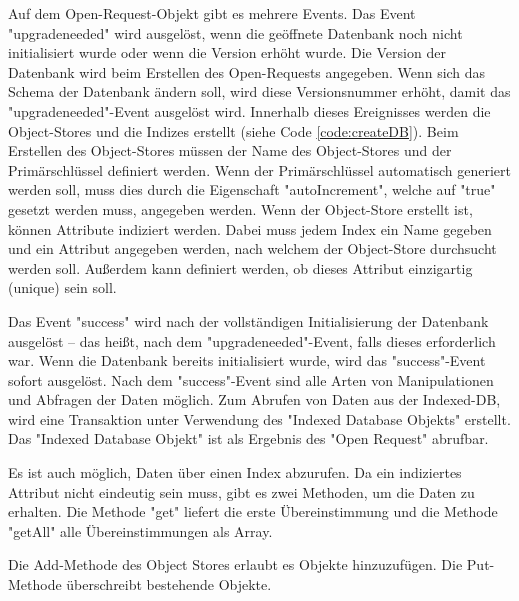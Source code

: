 Auf dem Open-Request-Objekt gibt es mehrere Events. 
Das Event "{\ttfamily upgradeneeded}" wird ausgelöst, wenn die geöffnete Datenbank noch nicht initialisiert wurde oder wenn die Version erhöht wurde. 
Die Version der Datenbank wird beim Erstellen des Open-Requests angegeben. 
Wenn sich das Schema der Datenbank ändern soll, wird diese Versionsnummer erhöht, damit das "{\ttfamily upgradeneeded}"-Event ausgelöst wird.
Innerhalb dieses Ereignisses werden die Object-Stores und die Indizes erstellt (siehe Code \ref{code:createDB}). 
Beim Erstellen des Object-Stores müssen der Name des Object-Stores und der Primärschlüssel definiert werden. Wenn der Primärschlüssel automatisch generiert werden soll, muss dies durch die Eigenschaft "autoIncrement", welche auf "true" gesetzt werden muss, angegeben werden.
Wenn der Object-Store erstellt ist, können Attribute indiziert werden. 
Dabei muss jedem Index ein Name gegeben und ein Attribut angegeben werden, nach welchem der Object-Store durchsucht werden soll. 
Außerdem kann definiert werden, ob dieses Attribut einzigartig (unique) sein soll.


Das Event "{\ttfamily success}" wird nach der vollständigen Initialisierung der Datenbank ausgelöst -- 
das heißt, nach dem "{\ttfamily upgradeneeded}"-Event, falls dieses erforderlich war. 
Wenn die Datenbank bereits initialisiert wurde, wird das "{\ttfamily success}"-Event sofort ausgelöst. 
Nach dem "{\ttfamily success}"-Event sind alle Arten von Manipulationen und Abfragen der Daten möglich. 
Zum Abrufen von Daten aus der Indexed-DB, wird eine Transaktion unter Verwendung des "Indexed Database Objekts" erstellt. 
Das "Indexed Database Objekt" ist als Ergebnis des "Open Request" abrufbar.


Es ist auch möglich, Daten über einen Index abzurufen. Da ein indiziertes 
Attribut nicht eindeutig sein muss, gibt es zwei Methoden, um die Daten zu erhalten. Die Methode "{\ttfamily get}" liefert die erste Übereinstimmung und die Methode "{\ttfamily getAll}" alle Über\-ein\-stimmungen als Array.


Die Add-Methode des Object Stores erlaubt es Objekte hinzuzufügen. Die Put-Methode überschreibt bestehende Objekte.
\cite{MDNIndexedDB}
\cite{MDNUsingIndexedDB}